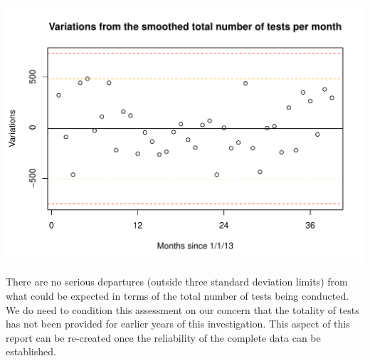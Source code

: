 \includegraphics{Figures/Monthly-QCC}

There are no serious  departures (outside three standard deviation limits) from what could be expected in terms of the total number of tests being conducted. We do need to condition this assessment on our concern that the totality of tests has not been provided for earlier years of this investigation. This aspect of this report can be re-created once the reliability of the complete data can be established.


